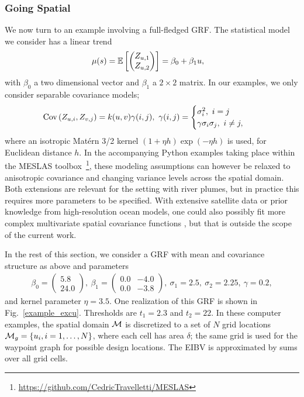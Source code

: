 \documentclass[aoas]{imsart}
\begin{document}
\subsubsection{Going Spatial}
\label{sec:including_spatiality}

We now turn to an example involving a full-fledged GRF. The statistical model we consider has a linear trend
\begin{align*}
\mu(s)=\mathbb{E}\left[\begin{pmatrix}
Z_{\spatloc, 1}\\ Z_{\spatloc, 2}
\end{pmatrix}\right] &= \beta_0 + \beta_1 \spatloc,
\end{align*}
with $\beta_0$ a two dimensional vector and $\beta_1$ a $2\times 2$ matrix. In our examples, we only consider separable covariance models;
\begin{align*}
\textrm{Cov}\left(Z_{\spatloc, i}, Z_{v, j}\right) &= k(\spatloc, v) \gamma(i, j),~ \gamma(i, j) = \begin{cases} \sigma_i^2,~ i=j\\
   \gamma \sigma_i \sigma_j,~i\neq j,
        \end{cases}
\end{align*}
where an isotropic Mat\'{e}rn 3/2 kernel $(1+\eta h)\exp (-\eta h)$ is
used, for Euclidean distance $h$.  In the accompanying Python examples
taking place within the MESLAS
toolbox~\footnote{\url{https://github.com/CedricTravelletti/MESLAS}},
these modeling assumptions can however be relaxed to anisotropic
covariance and changing variance levels across the spatial
domain. Both extensions are relevant for the setting with river
plumes, but in practice this requires more parameters to be
specified. With extensive satellite data or prior knowledge from
high-resolution ocean models, one could also possibly fit more complex
multivariate spatial covariance functions
\citep{gneiting2010matern,genton2015cross}, but that is outside the
scope of the current work.

In the rest of this section, we consider a GRF with mean and
covariance structure as above and parameters
\begin{align*}
\beta_0 = \begin{pmatrix}
5.8\\ 24.0
\end{pmatrix}, ~ \beta_1 = \begin{pmatrix}
0.0 & -4.0\\
0.0 & -3.8
\end{pmatrix},~ \sigma_1 = 2.5,~ \sigma_2 = 2.25, ~ \gamma = 0.2,
\end{align*}
and kernel parameter $\eta=3.5$.
One realization of this GRF is shown in Fig.~\ref{example_excu}. Thresholds are $t_1=2.3$ and $t_2=22$.
In these computer examples, the spatial domain $\mathcal{M}$ is
discretized to a set of $N$ grid locations
$\mathcal{M}_g = \{u_i, i=1,\ldots,N \}$, where each cell has area
$\delta$; the same grid is used for the waypoint graph for possible
design locations. The EIBV is approximated by sums over all grid
cells. 
\end{document}

